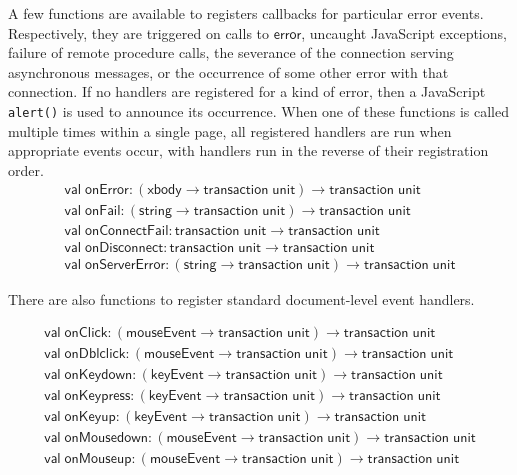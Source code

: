 \documentclass{article}
\newcommand{\cd}[1]{\texttt{#1}}
\newcommand{\mt}[1]{\mathsf{#1}}
\begin{document}
A few functions are available to registers callbacks for particular error events.  Respectively, they are triggered on calls to $\mt{error}$, uncaught JavaScript exceptions, failure of remote procedure calls, the severance of the connection serving asynchronous messages, or the occurrence of some other error with that connection.  If no handlers are registered for a kind of error, then a JavaScript \cd{alert()} is used to announce its occurrence.  When one of these functions is called multiple times within a single page, all registered handlers are run when appropriate events occur, with handlers run in the reverse of their registration order.
$$\begin{array}{l}
  \mt{val} \; \mt{onError} : (\mt{xbody} \to \mt{transaction} \; \mt{unit}) \to \mt{transaction} \; \mt{unit} \\
  \mt{val} \; \mt{onFail} : (\mt{string} \to \mt{transaction} \; \mt{unit}) \to \mt{transaction} \; \mt{unit} \\
  \mt{val} \; \mt{onConnectFail} : \mt{transaction} \; \mt{unit} \to \mt{transaction} \; \mt{unit} \\
  \mt{val} \; \mt{onDisconnect} : \mt{transaction} \; \mt{unit} \to \mt{transaction} \; \mt{unit} \\
  \mt{val} \; \mt{onServerError} : (\mt{string} \to \mt{transaction} \; \mt{unit}) \to \mt{transaction} \; \mt{unit}
\end{array}$$

There are also functions to register standard document-level event handlers.

$$\begin{array}{l}
 \mt{val} \; \mt{onClick} : (\mt{mouseEvent} \to \mt{transaction} \; \mt{unit}) \to \mt{transaction} \; \mt{unit} \\
 \mt{val} \; \mt{onDblclick} : (\mt{mouseEvent} \to \mt{transaction} \; \mt{unit}) \to \mt{transaction} \; \mt{unit} \\
 \mt{val} \; \mt{onKeydown} : (\mt{keyEvent} \to \mt{transaction} \; \mt{unit}) \to \mt{transaction} \; \mt{unit} \\
 \mt{val} \; \mt{onKeypress} : (\mt{keyEvent} \to \mt{transaction} \; \mt{unit}) \to \mt{transaction} \; \mt{unit} \\
 \mt{val} \; \mt{onKeyup} : (\mt{keyEvent} \to \mt{transaction} \; \mt{unit}) \to \mt{transaction} \; \mt{unit} \\
 \mt{val} \; \mt{onMousedown} : (\mt{mouseEvent} \to \mt{transaction} \; \mt{unit}) \to \mt{transaction} \; \mt{unit} \\
 \mt{val} \; \mt{onMouseup} : (\mt{mouseEvent} \to \mt{transaction} \; \mt{unit}) \to \mt{transaction} \; \mt{unit}
\end{array}$$
\end{document}
